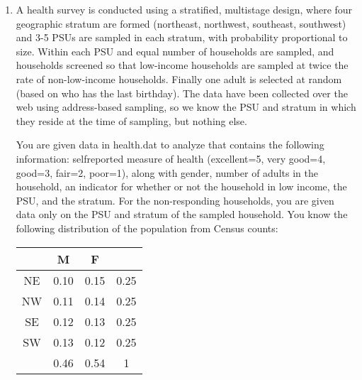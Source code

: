 \documentclass[12pt]{article}
\begin{document}
\begin{enumerate}
\begin{enumerate}[itemsep=5ex]
\item Compute the mean height and associated standard error using the complete case data {\bf [5 pt]}

\item Compute the mean height and associated standard error using a single imputation hot desk {\bf [5 pt]}

\item Compute the mean height and associated standard error using multiple imputation with 20 imputed datasets. You may do this “by hand” following the algorithm from class, or use on of the software packages for MI. Explain your choice of imputation model. {\bf [15 pt]}

\end{enumerate}

\item A health survey is conducted using a stratified, multistage design, where four geographic stratum are formed (northeast, northwest, southeast, southwest) and 3-5 PSUs are sampled in each stratum, with probability proportional to size. Within each PSU and equal number of households are sampled, and households screened so that low-income households are sampled at twice the rate of non-low-income households. Finally one adult is selected at random (based on who has the last birthday). The data have been collected over the web using address-based sampling, so we know the PSU and stratum in which they reside at the time of sampling, but nothing else.
\vspace{0.5cm}

You are given data in health.dat to analyze that contains the following information: selfreported measure of health (excellent=5, very good=4, good=3, fair=2, poor=1), along with gender, number of adults in the household, an indicator for whether or not the household in low income, the PSU, and the stratum. For the non-responding households, you are given data only on the PSU and stratum of the sampled household. You know the following distribution of the population from Census counts:

\begin{table}[!th]
\centering
\begin{tabular}{c c c | c}
& M & F & \\ \hline
NE & 0.10 & 0.15 & 0.25 \\
NW & 0.11 & 0.14 & 0.25 \\
SE & 0.12 & 0.13 & 0.25 \\
SW & 0.13 & 0.12 & 0.25 \\ \hline
& 0.46 & 0.54 & 1 \\ \hline
\end{tabular}
\end{table}


\end{enumerate}
\end{document}
